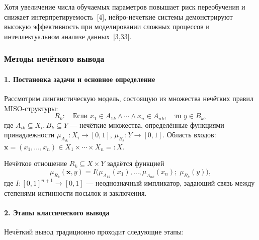 Хотя увеличение числа обучаемых параметров повышает риск переобучения и
снижает интерпретируемость~[4], нейро-нечеткие системы демонстрируют высокую
эффективность при моделировании сложных процессов и интеллектуальном
анализе данных~[3,33].


\subsubsection{Методы нечёткого вывода}

\paragraph{1. Постановка задачи и основное определение}
Рассмотрим лингвистическую модель, состоящую из множества нечётких правил MISO-структуры:
\begin{equation}
  R_k:\quad
  \text{Если }x_1\in A_{1k}\wedge\cdots\wedge x_n\in A_{nk},\quad
  \text{то }y\in B_k,
  \label{eq:rule_general}
\end{equation}
где $A_{ik}\subseteq X_i, B_k\subseteq Y$ — нечёткие множества,
определённые функциями принадлежности
$\mu_{A_{ik}}:X_i\to[0,1]$, $\mu_{B_k}:Y\to[0,1]$.
Область входов: $\mathbf{x}=(x_1,\dots,x_n)\in X_1\times\cdots\times X_n=:X$.

\begin{definition}
Нечёткое отношение $R_k\subseteq X\times Y$ задаётся функцией
$$
  \mu_{R_k}(\mathbf{x},y)
  = I\bigl(\mu_{A_{1k}}(x_1),\dots,\mu_{A_{nk}}(x_n);\;\mu_{B_k}(y)\bigr),
$$
где $I:[0,1]^{n+1}\to[0,1]$ — неоднозначный импликатор, задающий связь
между степенями истинности посылок и заключения.
\end{definition}

\paragraph{2. Этапы классического вывода}
Нечёткий вывод традиционно проходит следующие этапы:

